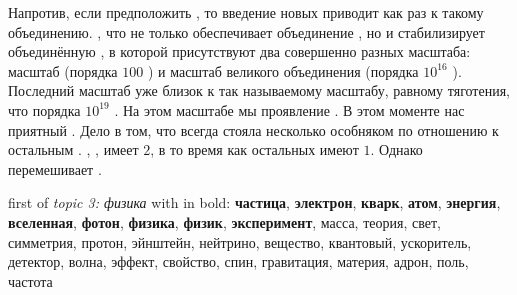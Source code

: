 \documentclass[a4paper,12pt]{article}
\author{Алексеев Василий, 474}
\title{}
\date{}
\begin{document}

  \noi
  Напротив, если предположить  , то введение новых  приводит как раз к такому объединению.
  , что  не только обеспечивает объединение , но и стабилизирует объединённую , в которой присутствуют два совершенно разных масштаба: масштаб    (порядка $100$  ) и масштаб великого объединения (порядка $10^{16}$  ).
  Последний масштаб уже близок к так называемому  масштабу, равному    тяготения, что  порядка $10^{19}$  .
  На этом масштабе мы  проявление   .
  В этом моменте нас  приятный .
  Дело в том, что  всегда стояла несколько особняком по отношению к остальным .
   , , имеет  $2$, в то время как  остальных  имеют  $1$.
  Однако  перемешивает .

  \bigskip

  \noi
   first  of \emph{topic 3: физика} with  in bold: \textbf{частица}, \textbf{электрон}, \textbf{кварк}, \textbf{атом}, \textbf{энергия}, \textbf{вселенная}, \textbf{фотон}, \textbf{физика}, \textbf{физик}, \textbf{эксперимент}, масса, теория, свет, симметрия, протон, эйнштейн, нейтрино, вещество, квантовый, ускоритель, детектор, волна, эффект, свойство, спин, гравитация, материя, адрон, поль, частота
\end{document}
